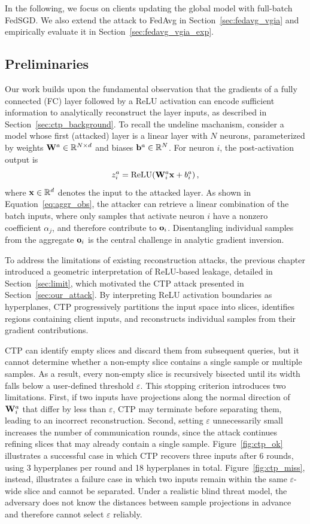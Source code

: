 In the following, we focus on clients updating the global model with full-batch FedSGD. We also extend the attack to FedAvg in Section~\ref{sec:fedavg_vgia} and empirically evaluate it in Section~\ref{sec:fedavg_vgia_exp}.

\subsection{Preliminaries}\label{subsec:preliminaries}
Our work builds upon the fundamental observation that the gradients of a fully connected (FC) layer followed by a ReLU activation can encode sufficient information to analytically reconstruct the layer inputs, as described in Section~\ref{sec:ctp_background}. 
To recall the undeline machanism, consider a model whose first (attacked) layer is a linear layer with $N$ neurons, parameterized by weights $\mathbf{W}^a \in \mathbb{R}^{N \times d}$ and biases ${\mathbf{b}}^a \in \mathbb{R}^N$. For neuron $i$, the post-activation output is
\[
z_i^a = \mathrm{ReLU}\!\left(\mathbf{W}_i^a {\mathbf{x}} + b_i^a\right),
\]
where ${\mathbf{x}} \in \mathbb{R}^d$ denotes the input to the attacked layer. As shown in Equation~\ref{eq:aggr_obs}, the attacker can retrieve a linear combination of the batch inputs, where only samples that activate neuron $i$ have a nonzero coefficient $\alpha_j$, and therefore contribute to ${\mathbf{o}}_i$. Disentangling individual samples from the aggregate ${\mathbf{o}}_i$ is the central challenge in analytic gradient inversion.

To address the limitations of existing reconstruction attacks, the previous chapter introduced a geometric interpretation of ReLU-based leakage, detailed in Section~\ref{sec:limit}, which motivated the CTP attack presented in Section~\ref{sec:our_attack}. By interpreting ReLU activation boundaries as hyperplanes, CTP progressively partitions the input space into slices, identifies regions containing client inputs, and reconstructs individual samples from their gradient contributions.

CTP can identify empty slices and discard them from subsequent queries, but it cannot determine whether a non-empty slice contains a single sample or multiple samples. As a result, every non-empty slice is recursively bisected until its width falls below a user-defined threshold \(\varepsilon\). This stopping criterion introduces two limitations. First, if two inputs have projections along the normal direction of \(\mathbf{W}_i^a\) that differ by less than \(\varepsilon\), CTP may terminate before separating them, leading to an incorrect reconstruction. Second, setting \(\varepsilon\) unnecessarily small increases the number of communication rounds, since the attack continues refining slices that may already contain a single sample. Figure~\ref{fig:ctp_ok} illustrates a successful case in which CTP recovers three inputs after 6 rounds, using 3 hyperplanes per round and 18 hyperplanes in total. Figure~\ref{fig:ctp_miss}, instead, illustrates a failure case in which two inputs remain within the same \(\varepsilon\)-wide slice and cannot be separated. Under a realistic blind threat model, the adversary does not know the distances between sample projections in advance and therefore cannot select \(\varepsilon\) reliably.


